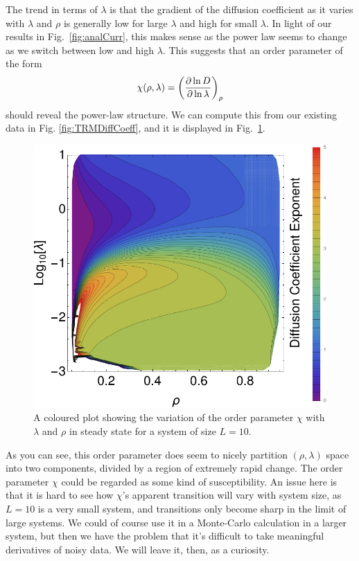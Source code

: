 The trend in terms of $\lambda$ is that the gradient of the diffusion coefficient as it varies with 
$\lambda$ and $\rho$ is generally low for large $\lambda$ and high for small $\lambda$. In light
of our results in Fig.~\ref{fig:analCurr}, this makes sense as the power law seems to change as we switch
between low and high $\lambda$. This suggests that an order parameter of the form
\begin{equation}
 \chi(\rho, \lambda) = \left(\frac{\partial \ln{D}}{\partial \ln{\lambda}}\right)_\rho
\end{equation}
should reveal the power-law structure. We can compute this from our existing data in Fig.
\ref{fig:TRMDiffCoeff}, and it is displayed in Fig.~\ref{fig:TRMOrderParam}.
 \begin{figure}[h!]
 \caption[The variation of the order parameter $\chi$ for a system of size $L=10$ with respect to $\lambda$
 and $\rho$.]{\label{fig:TRMOrderParam} 
A coloured plot showing the variation of the order parameter $\chi$ with $\lambda$ and $\rho$
in steady state for a 
system of size $L=10$.
 }
  \begin{center}
 \includegraphics[width=1.0\textwidth]{TRM/images/TRMOrderParam}
  \end{center}
\end{figure}
As you can see, this order parameter does seem to nicely partition $(\rho, \lambda)$ space into two
components, divided by a region of extremely rapid change. The order parameter $\chi$ could be regarded as
some kind of susceptibility. An issue here is that it is hard to see how $\chi$'s apparent transition
will vary with system size, as $L=10$ is a very small system, and transitions only become sharp in the
limit of large systems. We could of course use it in a Monte-Carlo calculation in a larger system, but
then we have the problem that it's difficult to take meaningful derivatives of noisy data. We will leave
it, then, as a curiosity.

